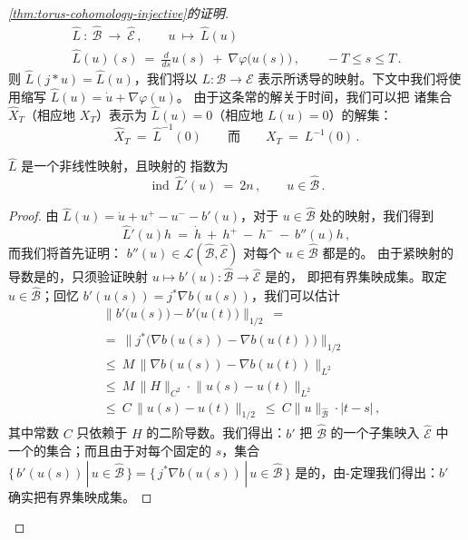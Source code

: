 \begin{proof}[\cref*{thm:torus-cohomology-injective}的证明]
\begin{equation}
\begin{gathered}
\widehat{L}\ :\ \widehat{\mathcal{B}}\ \longrightarrow\ \widehat{\mathcal{E}}\,,%
\qquad u\ \mapsto\ \widehat{L}(u)\\
\widehat{L}(u)(s)\ =\ \tfrac{d}{ds}u(s)\ +\ \nabla\varphi\bigl(u(s)\bigr)\,,%
\qquad -T\leq s\leq T\,.
\end{gathered}
\end{equation}
则 $\widehat{L}(j*u)=\widehat{L}(u)$，我们将以 $L:\mathcal{B}\to\mathcal{E}$%
表示所诱导的映射。下文中我们将使用缩写 $\widehat{L}(u)=\dot{u}+\nabla\varphi(u)$。%
由于这条\trSmooth{}常\trDifferentialEquation{}的解关于时间\trSmooth，我们可以把%
诸集合 $\widehat{X}_{T}$（相应地 $X_{T}$）表示为 $\widehat{L}(u)=0$（相应地%
$L(u)=0$）的解集：
\begin{equation}\label{eq:torus-x-as-preimage}
\widehat{X}_{T}\ =\ \widehat{L}^{-1}(0)\qquad\text{而}\qquad X_{T}\ =\ L^{-1}(0)\,.
\end{equation}

\begin{proposition}\label{prop:fredholm-map-l}
$\widehat{L}$ 是一个非线性\trFredholm{}映射，且\trLinearization{}映射的%
\trFredholm{}指数为
\[
\operatorname{ind}\,\widehat{L}'(u)\ =\ 2n\,,\qquad u\in\widehat{\mathcal{B}}\,.
\]
\end{proposition}

\begin{proof}
由 $\widehat{L}(u)=\dot{u}+u^{+}-u^{-}-b'(u)$，对于 $u\in\widehat{\mathcal{B}}$%
处的\trLinearization{}映射，我们得到
\begin{equation}\label{eq:torus-linearized-map}
\widehat{L}'(u)h\ =\ \dot{h}\ +\ h^{+}\ -\ h^{-}\ -\ b''(u)h\,,
\end{equation}
而我们将首先证明：\trLinearOperator{} $b''(u)\in\mathcal{L}(\widehat{\mathcal{B}},%
\widehat{\mathcal{E}})$ 对每个 $u\in\widehat{\mathcal{B}}$ 都是\trCompact{}的。%
由于\trSmooth{}紧映射的导数是\trCompact{}的，只须验证映射%
$u\mapsto b'(u):\widehat{\mathcal{B}}\to\widehat{\mathcal{E}}$ 是\trCompact{}的，%
即把有界集映成\trPrecompact{}集。取定 $u\in\widehat{\mathcal{B}}$；回忆%
$b'(u(s))=j^{*}\nabla b(u(s))$，我们可以估计
\[
\begin{aligned}
&\bigl\|b'\bigl(u(s)\bigr)-b'\bigl(u(t)\bigr)\bigr\|_{1/2}\ =\\
&=\ \bigl\|j^{*}\bigl(\nabla b(u(s))-\nabla b(u(t))\bigr)\bigr\|_{1/2}\\
&\leq\ M\,\bigl\|\nabla b(u(s))-\nabla b(u(t))\bigr\|_{L^{2}}\\
&\leq\ M\,\|H\|_{C^{2}}\cdot\bigl\|u(s)-u(t)\bigr\|_{L^{2}}\\
&\leq\ C\,\bigl\|u(s)-u(t)\bigr\|_{1/2}\ \leq\ C\|u\|_{\widehat{\mathcal{B}}}\cdot|t-s|\,,
\end{aligned}
\]
其中常数 $C$ 只依赖于\trHamiltonianFunction{} $H$ 的二阶导数。我们得出：$b'$%
把 $\widehat{\mathcal{B}}$ 的一个\trBounded{}子集映入 $\widehat{\mathcal{E}}$ 中%
一个\trEquicontinuous{}的集合；而且由于对每个固定的 $s$，集合 $\{\,b'(u(s))\,|\,u\in%
\widehat{\mathcal{B}}\,\}=\{\,j^{*}\nabla b(u(s))\,|\,u\in\widehat{\mathcal{B}}\,\}$%
是\trPrecompact{}的，由\trArzela-\trAscoli{}定理我们得出：$b'$ 确实把有界集映成\trPrecompact{}集。


\end{proof}
\end{proof}
